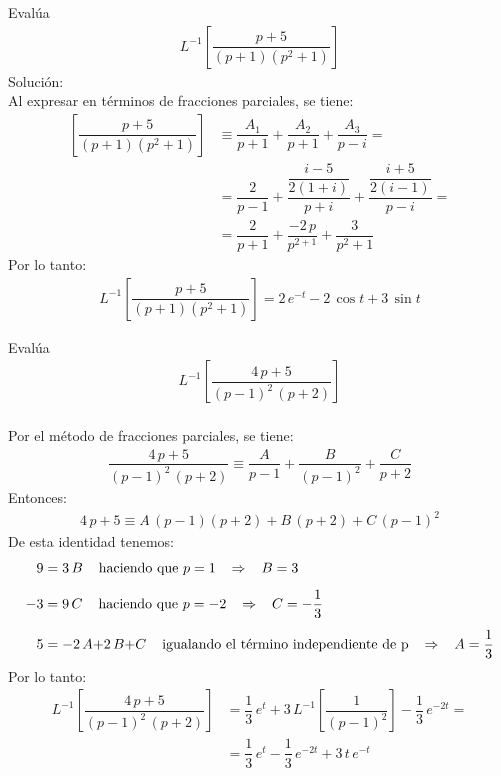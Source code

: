 \begin{ejemplo} Evalúa
\begin{align*}
L^{-1} \left[ \dfrac{p + 5}{(p + 1)(p^{2} + 1)} \right]
\end{align*}
\noindent Solución:
\\[0.5em]
Al expresar en términos de fracciones parciales, se tiene:
\begin{align*}
\left[ \dfrac{p + 5}{(p + 1)(p^{2} + 1)} \right] &\equiv \dfrac{A_{1}}{p + 1} + \dfrac{A_{2}}{p + 1} + \dfrac{A_{3}}{p - i} = \\[0.5em]
&= \dfrac{2}{p -1} + \dfrac{\dfrac{i - 5}{2(1 + i)}}{p + i} + \dfrac{\dfrac{i + 5}{2(i - 1)}}{p - i} = \\[0.5em]
&= \dfrac{2}{p + 1} + \dfrac{-2 \, p}{p^{2 + 1}} + \dfrac{3}{p^2 + 1}
\end{align*}
Por lo tanto:
\begin{align*}
L^{-1} \left[ \dfrac{p + 5}{(p + 1)(p^{2} + 1)} \right] = 2 \, e^{-t} - 2 \, \cos t +  3 \, \sin t
\end{align*}
\end{ejemplo}
\begin{ejemplo}
Evalúa
\begin{align*}
L^{-1} \left[ \dfrac{4 \, p + 5}{(p - 1)^{2} \, (p + 2)} \right]
\end{align*}
\\[0.5em]
Por el método de fracciones parciales, se tiene:
\begin{align*}
\dfrac{4 \, p + 5}{(p - 1)^{2} \, (p + 2)} \equiv \dfrac{A}{p - 1} + \dfrac{B}{(p - 1)^{2}} + \dfrac{C}{p + 2}
\end{align*}
Entonces:
\begin{align*}
4 \, p + 5 \equiv A \, (p - 1)(p + 2) + B \, (p + 2) + C \, (p - 1)^{2}
\end{align*}
De esta identidad tenemos:
\begin{align*}
9 &= 3 \, B \hspace{0.4cm} \mbox{haciendo que } p = 1 \hspace{0.3cm} \Rightarrow \hspace{0.3cm} B = 3 \\[0.5em]
- 3 &= 9 \, C \hspace{0.4cm} \mbox{haciendo que } p = -2 \hspace{0.3cm} \Rightarrow \hspace{0.3cm} C = -\dfrac{1}{3} \\[0.5em]
5 &= -2 \, A {+}  2 \, B {+} C \hspace{0.4cm} \mbox{igualando el término independiente de p} \hspace{0.3cm} \Rightarrow \hspace{0.3cm} A = \dfrac{1}{3}
\end{align*}
Por lo tanto:
\begin{align*}
L^{-1} \left[ \dfrac{4 \, p + 5}{(p - 1)^{2} \, (p + 2)} \right] &= \dfrac{1}{3} \, e^{t} +  3 \, L^{-1} \left[\dfrac{1}{(p - 1)^{2}} \right] - \dfrac{1}{3} \, e^{-2 t} = \\[0.5em]
&= \dfrac{1}{3} \, e^{t} - \dfrac{1}{3} \, e^{- 2 t} + 3 \, t \, e^{-t}
\end{align*}
\end{ejemplo}

